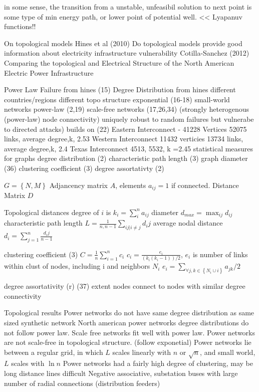 in some sense, the transition from a unstable, unfeasibil solution to next point is some type of min energy path, or lower point of potential well.  << Lyapanuv functions!!


On topological models
Hines et al (2010) Do topological models provide good information about electricity infrastructure vulnerability  
Cotilla-Sanchez (2012) Comparing the topological and Electrical Structure of the North American Electric Power Infrastructure \cite{cotilla_2012}

Power Law Failure
from hines (15)
Degree Distribution
from hines different countries/regions different topo structure
exponential (16-18) small-world networks
power-law (2,19)
scale-free networks (17,26,34) (strongly heterogenous (power-law) node connectivity) uniquely robust to random failures but vulnerabe to directed attacks)
builds on (22)
Eastern Interconnect - 41228 Vertices 52075 links, average degree,k, 2.53
Western Interconnect 11432 verticies 13734 links, average degree,k, 2.4
Texas Interconnect 4513, 5532, k =2.45
statistical measures for graphs
degree distribution (2)
characteristic path length (3)
graph diameter (36)
clustering coefficient (3)
degree assortativty (2)

$ G = \left\{ N, M \right\}$
Adjancency matrix $A$, elements $a_{ij} = 1$ if connected.
Distance Matrix $D$

Topological distances
degree of $i$ is $k_i = \sum_i^n a_{ij}$
diameter $d_{max} = \max_{ij} d_{ij}$
characteristic path length $L = \frac{1}{n,n-1} \sum_{ij | i \neq j} d_ij$
average nodal distance $d_i = \sum_{j=1}^n \frac{d_ij}{n-1}$

clustering coefficient (3)
$ C = \frac{1}{n} \sum_{i=1}^n c_i$
$c_i = \frac{e_i}{(k_i(k_i - 1))/2}$, $e_i$ is number of links within clust of nodes, including i and neighbors $N_i$
$e_i = \sum_{\forall j,k \in \left\{ N_i \cup i \right\}} a_{jk}/2$

degree assortativity (r) (37)
extent nodes connect to nodes with similar degree connectivity

Topological results
Power networks do not have same degree distribution as same sized synthetic network
North american power networks degree distributions do not follow power law. Scale free networks fit well with power law.  Power networks are not scale-free in topological structure.  (follow exponetial)
Power networks lie between a regular grid, in which $L$ scales linearly with $n$ or $\sqrt{n}$, and small world, $L$ scales with $\ln{n}$
Power networks had a fairly high degree of clustering, may be long distance lines difficult
Negative associative, substation buses with large number of radial connections (distribution feeders)

